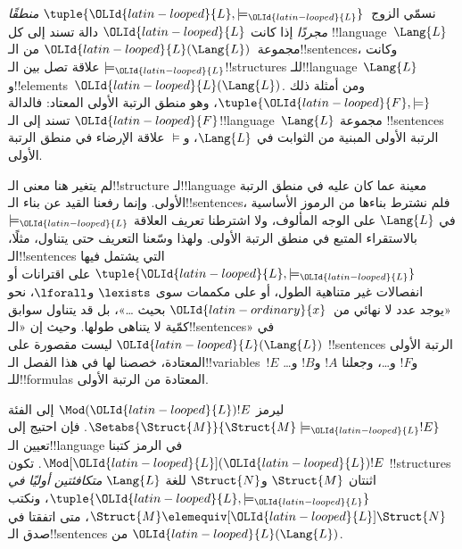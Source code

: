 \documentclass[../../../include/open-logic-section]{subfiles}
\begin{document}

\begin{defn}
نسمّي الزوج~$\tuple{\OLId{latin-looped}{L},\models_\OLId{latin-looped}{L}}$ \emph{منطقًا مجردًا} إذا كانت $\OLId{latin-looped}{L}$ دالة تسند إلى
كل !!{language}~$\Lang{L}$ مجموعة~$\OLId{latin-looped}{L}(\Lang{L})$ من الـ!!{sentence}s،
وكانت $\models_\OLId{latin-looped}{L}$ علاقة تصل بين الـ!!{structure}s للـ!!{language}~$\Lang{L}$
و!!{element}s~$\OLId{latin-looped}{L}(\Lang{L})$. ومن أمثلة ذلك
$\tuple{\OLId{latin-looped}{F},\models}$، وهو منطق الرتبة الأولى المعتاد: فالدالة $\OLId{latin-looped}{F}$
تسند إلى الـ!!{language}~$\Lang{L}$ مجموعة !!{sentence}s الرتبة
الأولى المبنية من الثوابت في $\Lang{L}$، و$\models$ علاقة الإرضاء في
منطق الرتبة الأولى.
\end{defn}

لم يتغير هنا معنى الـ!!{structure} لـ!!{language}
معينة عما كان عليه في منطق الرتبة الأولى. وإنما رفعنا القيد عن بناء الـ!!{sentence}s،
فلم نشترط بناءها من الرموز الأساسية في $\Lang{L}$ على الوجه المألوف، ولا اشترطنا تعريف العلاقة
$\models_\OLId{latin-looped}{L}$ بالاستقراء المتبع في منطق الرتبة الأولى. ولهذا وسّعنا
التعريف حتى يتناول، مثلًا، الـ!!{sentence}s التي يشتمل فيها
$\tuple{\OLId{latin-looped}{L},\models_\OLId{latin-looped}{L}}$ على اقترانات أو انفصالات غير متناهية الطول، أو على مكممات
سوى $\lexists$ و$\lforall$، نحو «يوجد عدد لا نهائي من~$\OLId{latin-ordinary}{x}$ بحيث
\dots»، بل قد يتناول سوابق كمّية لا يتناهى طولها. وحيث إن
«الـ!!{sentence}s» في $\OLId{latin-looped}{L}(\Lang{L})$ ليست مقصورة على !!{sentence}s
الرتبة الأولى المعتادة، خصصنا لها في هذا الفصل الـ!!{variable}s~$!E$
و$!F$ و\dots، وجعلنا $!A$ و$!B$ و\dots للـ!!{formula}s
المعتادة من الرتبة الأولى.

\begin{defn}
ليرمز $\Mod(\OLId{latin-looped}{L}){!E}$ إلى الفئة
$\Setabs{\Struct{M}}{\Struct{M} \models_\OLId{latin-looped}{L} !E}$. فإن احتيج إلى تعيين
الـ!!{language} في الرمز كتبنا $\Mod[\OLId{latin-looped}{L}](\OLId{latin-looped}{L}){!E}$. تكون !!{structure}s اثنتان
$\Struct{M}$ و$\Struct{N}$ للغة $\Lang{L}$ \emph{متكافئتين أوليًا في}
$\tuple{\OLId{latin-looped}{L},\models_\OLId{latin-looped}{L}}$، ونكتب
$\Struct{M} \elemequiv[\OLId{latin-looped}{L}] \Struct{N}$، متى اتفقتا في صدق الـ!!{sentence}s
من $\OLId{latin-looped}{L}(\Lang{L})$.
\end{defn}
\end{document}
